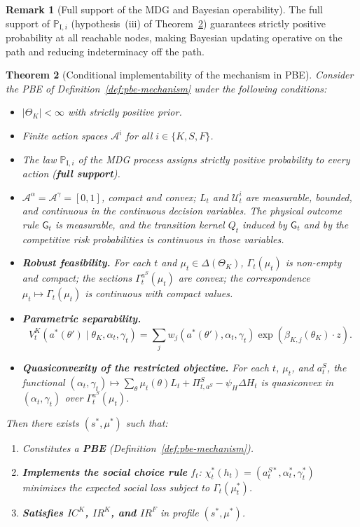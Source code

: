 \documentclass[12pt]{article}
\numberwithin{equation}{section}
\numberwithin{table}{section}
\newtheorem{theorem}{Theorem}[section]
\theoremstyle{definition}
\newtheorem{remark}[theorem]{Remark}
\newcommand{\ProbI}[1]{\mathbb{P}_{\mathrm{I},#1}}
\begin{document}
\begin{remark}[Full support of the MDG and Bayesian operability]
The full support of $\ProbI{i}$ (hypothesis~(iii) of
Theorem~\ref{thm:ebp-implementabilidad}) guarantees strictly positive
probability at all reachable nodes, making Bayesian updating operative on the
path and reducing indeterminacy off the path.
\end{remark}

\bigskip

\begin{theorem}[Conditional implementability of the mechanism in PBE]
\label{thm:ebp-implementabilidad}
Consider the PBE of Definition~\ref{def:pbe-mechanism} under the
following conditions:
\begin{itemize}
  \item[\textup{(i)}] $|\Theta_K|<\infty$ with strictly positive prior.
  \item[\textup{(ii)}] Finite action spaces $\mathcal{A}^i$ for all
  $i\in\{K,S,F\}$.
  \item[\textup{(iii)}] The law $\ProbI{i}$ of the MDG process assigns strictly
  positive probability to every action (\textbf{full support}).
  \item[\textup{(iv)}] $\mathcal{A}^\alpha=\mathcal{A}^\gamma=[0,1]$,
  compact and convex; $L_t$ and $\mathcal{U}_t^i$ are measurable, bounded, and
  continuous in the continuous decision variables. The physical outcome rule
  $\mathsf{G}_t$ is measurable, and the transition kernel $Q_t$ induced by
  $\mathsf{G}_t$ and by the competitive risk probabilities is continuous in
  those variables.
  \item[\textup{(v)}] \textbf{Robust feasibility.}
  For each $t$ and $\mu_t\in\Delta(\Theta_K)$, $\Gamma_t(\mu_t)$ is non-empty
  and compact; the sections $\Gamma_t^{a^S}(\mu_t)$ are convex; the
  correspondence $\mu_t\mapsto\Gamma_t(\mu_t)$ is continuous with compact
  values.
  \item[\textup{(vi)}] \textbf{Parametric separability.}
  \[
  V^K_t(a^\ast(\theta')\mid\theta_K,\alpha_t,\gamma_t)
  =
  \sum_jw_j(a^\ast(\theta'),\alpha_t,\gamma_t)
  \exp(\beta_{K,j}(\theta_K)\cdot z).
  \]
  \item[\textup{(vii)}] \textbf{Quasiconvexity of the restricted objective.}
  For each $t$, $\mu_t$, and $a_t^S$, the functional
  $(\alpha_t,\gamma_t)\mapsto\sum_\theta\mu_t(\theta)L_t+\Pi^S_{t,a^S}
  -\psi_H\Delta H_t$ is quasiconvex in $(\alpha_t,\gamma_t)$ over
  $\Gamma_t^{a^S}(\mu_t)$.
\end{itemize}
Then there exists $(s^\ast,\mu^\ast)$ such that:
\begin{enumerate}
  \item[\textup{(a)}] Constitutes a \textbf{PBE}
  (Definition~\ref{def:pbe-mechanism}).
  \item[\textup{(b)}] \textbf{Implements the social choice rule} $f_t$:
  $\chi_t^\ast(h_t)=(a_t^{S\ast},\alpha_t^\ast,\gamma_t^\ast)$ minimizes the
  expected social loss subject to $\Gamma_t(\mu_t^\ast)$.
  \item[\textup{(c)}] \textbf{Satisfies $IC^K$, $IR^K$, and $IR^F$} in profile
  $(s^\ast,\mu^\ast)$.
\end{enumerate}
\end{theorem}
\end{document}
